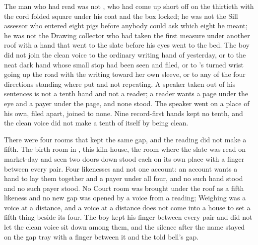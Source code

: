 \scenebreak

The man who had read was not , who had come up short off  on the thirtieth with the cord folded square under his coat and the box locked; he was not the Sill assessor who entered eight pigs before anybody could ask which eight he meant; he was not the Drawing collector who had taken the first measure under another roof with a hand that went to the slate before his eyes went to the bed. The boy did not join the clean voice to the ordinary writing hand of yesterday, or to the neat dark hand whose small stop had been seen and filed, or to 's turned wrist going up the road with the writing toward her own sleeve, or to any of the four directions standing where put and not repeating. A speaker taken out of his sentences is not a tenth hand and not a reader; a reader wants a page under the eye and a payer under the page, and none stood. The speaker went on a place of his own, filed apart, joined to none. Nine record-first hands kept no tenth, and the clean voice did not make a tenth of itself by being clean.

There were four rooms that kept the same gap, and the reading did not make a fifth. The birth room in , this kiln-house, the room where the slate was read on market-day and  seen two doors down stood each on its own place with a finger between every pair. Four likenesses and not one account: an account wants a hand to lay them together and a payer under all four, and no such hand stood and no such payer stood. No Court room was brought under the roof as a fifth likeness and no new gap was opened by a voice from a reading; Weighing was a voice at a distance, and a voice at a distance does not come into a house to set a fifth thing beside its four. The boy kept his finger between every pair and did not let the clean voice sit down among them, and the silence after the name stayed on the gap tray with a finger between it and the told bell's gap.


